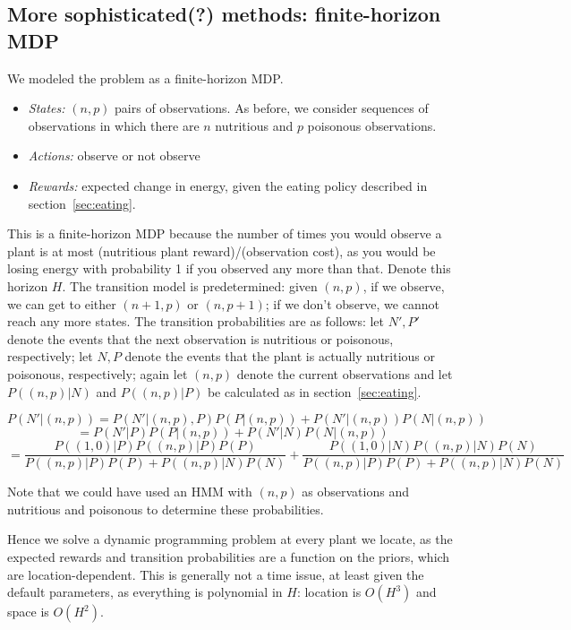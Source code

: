 \documentclass{article}
\begin{document}
\subsection{More sophisticated(?) methods: finite-horizon MDP}
We modeled the problem as a finite-horizon MDP.
\begin{itemize}
\item \emph{States:} $(n,p)$ pairs of observations. As before, we consider
  sequences of observations in which there are $n$ nutritious and $p$
  poisonous observations. 
\item \emph{Actions:} observe or not observe
\item \emph{Rewards:} expected change in energy, given the eating policy
  described in section~\ref{sec:eating}. 
\end{itemize}
This is a finite-horizon MDP because the number of times you would
observe a plant is at most (nutritious plant reward)/(observation cost),
as you would be losing energy with probability 1 if you observed any more
than that. Denote this horizon $H$.
The transition model is predetermined: given $(n,p)$, if we observe,
we can get to either $(n+1,p)$ or $(n,p+1)$; if we don't observe, we
cannot reach any more states. 
The transition probabilities are as follows:
let $N',P'$ denote the events that the next observation is nutritious or poisonous,
respectively; let $N,P$ denote the events that the plant is actually nutritious
or poisonous, respectively; again let $(n,p)$ denote the current observations
and let $P((n,p)|N)$ and $P((n,p)|P)$ be calculated as in section~\ref{sec:eating}.

\[P(N'|(n,p))=P(N'|(n,p),P)P(P|(n,p))+P(N'|(n,p))P(N|(n,p))\]
\[=P(N'|P)P(P|(n,p))+P(N'|N)P(N|(n,p))\]
\[=\frac{P((1,0)|P)P((n,p)|P)P(P)}{P((n,p)|P)P(P)+P((n,p)|N)P(N)} + \frac{P((1,0)|N)P((n,p)|N)P(N)}{P((n,p)|P)P(P)+P((n,p)|N)P(N)}\]

Note that we could have used an HMM with $(n,p)$ as observations 
and nutritious and poisonous to determine these probabilities. 

Hence we solve a dynamic programming problem at every plant we locate,
as the expected rewards and transition probabilities are a function on
the priors, which are location-dependent. This is generally not a time issue,
at least given the default parameters, 
as everything is polynomial in $H$: location is $O(H^3)$ and space is $O(H^2)$. 

\end{document}
